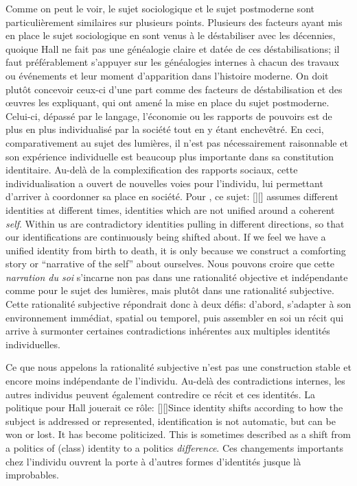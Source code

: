 Comme on peut le voir, le sujet sociologique et le sujet postmoderne sont particulièrement similaires sur plusieurs points. 
Plusieurs des facteurs ayant mis en place le sujet sociologique en sont venus à le déstabiliser avec les décennies, quoique Hall ne fait pas une généalogie claire et datée de ces déstabilisations; il faut préférablement s'appuyer sur les généalogies internes à chacun des travaux ou événements et leur moment d'apparition dans l'histoire moderne.
On doit plutôt concevoir ceux-ci d'une part comme des facteurs de déstabilisation et des œuvres les expliquant, qui ont amené la mise en place du sujet postmoderne. 
Celui-ci, dépassé par le langage, l'économie ou les rapports de pouvoirs est de plus en plus individualisé par la société tout en y étant enchevêtré. 
En ceci, comparativement au sujet des lumières, il n'est pas nécessairement raisonnable et son expérience individuelle est beaucoup plus importante dans sa constitution identitaire.
Au-delà de la complexification des rapports sociaux, cette individualisation a ouvert de nouvelles voies pour l'individu, lui permettant d'arriver à coordonner sa place en société. 
Pour \citeauthor{Hall1996a}, ce sujet: [{\citeyear[598]{Hall1996a}}][]{\textelp{} assumes different identities at different times, identities which are not unified around a coherent \emph{self}. Within us are contradictory identities pulling in different directions, so that our identifications are continuously being shifted about. If we feel we have a unified identity from birth to death, it is only because we construct a comforting story or ``narrative of the self'' about ourselves}. 
Nous pouvons croire que cette \emph{narration du soi} s'incarne non pas dans une rationalité objective et indépendante comme pour le sujet des lumières, mais plutôt dans une rationalité subjective. 
Cette rationalité subjective répondrait donc à deux défis: d'abord, s'adapter à son environnement immédiat, spatial ou temporel, puis assembler en soi un récit qui arrive à surmonter certaines contradictions inhérentes aux multiples identités individuelles.

Ce que nous appelons la rationalité subjective n'est pas une construction stable et encore moins indépendante de l'individu.
Au-delà des contradictions internes, les autres individus peuvent également contredire ce récit et ces identités.
La politique pour Hall jouerait ce rôle: [{\citeyear[610]{Hall1996a}}][]{Since identity shifts according to how the subject is addressed or represented, identification is not automatic, but can be won or lost. It has become politicized. This is sometimes described as a shift from a politics of (class) identity to a politics \emph{difference}}.
Ces changements importants chez l'individu ouvrent la porte à d'autres formes d'identités jusque là improbables.

